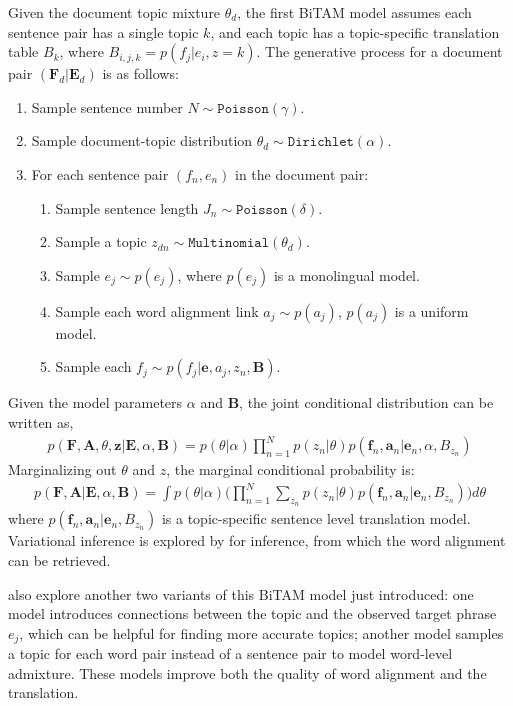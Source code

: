 Given the document topic mixture $\theta_d$, the first BiTAM model assumes each sentence pair has a single topic $k$, and each topic has a topic-specific translation table $B_k$, where $B_{i,j,k} = p(f_j | e_i, z=k)$. The generative process for a document pair $(\textbf{F}_d | \textbf{E}_d)$ is as follows:
\begin{enumerate}
\item Sample sentence number $N \sim \texttt{Poisson}(\gamma)$.
\item Sample document-topic distribution $\theta_d \sim \texttt{Dirichlet}(\alpha)$.
\item For each sentence pair $(f_n, e_n)$ in the document pair:
\begin{enumerate}
\item Sample sentence length $J_n \sim \texttt{Poisson}(\delta)$.
\item Sample a topic $z_{dn} \sim \texttt{Multinomial}(\theta_d)$.
\item Sample $e_j \sim p(e_j)$, where $p(e_j)$ is a monolingual model.
\item Sample each word alignment link $a_j \sim p(a_j)$, $p(a_j)$ is a uniform model.
\item Sample each $f_j \sim p(f_j | \textbf{e}, a_j, z_n, \textbf{B})$.
\end{enumerate}
\end{enumerate}

Given the model parameters $\alpha$ and $\textbf{B}$, the joint conditional distribution can be written as,
\begin{align}
p(\textbf{F}, \textbf{A}, \theta, \textbf{z} | \textbf{E}, \alpha, \textbf{B}) = p(\theta | \alpha) \prod_{n=1}^{N}p(z_n | \theta)p(\textbf{f}_n, \textbf{a}_n | \textbf{e}_n, \alpha, B_{z_n})
\end{align}
Marginalizing out $\theta$ and $z$, the marginal conditional probability is:
\begin{align}
p(\textbf{F}, \textbf{A} | \textbf{E}, \alpha, \textbf{B}) = \int p(\theta | \alpha) \Big ( \prod_{n=1}^{N} \sum_{z_n} p(z_n | \theta)p(\textbf{f}_n, \textbf{a}_n | \textbf{e}_n, B_{z_n}) \Big ) d\theta
\end{align}
where $p(\textbf{f}_n, \textbf{a}_n | \textbf{e}_n, B_{z_n})$ is a topic-specific sentence level translation model. Variational inference is explored by \citet{zhao-06} for inference, from which the word alignment can be retrieved.

\citet{zhao-06} also explore another two variants of this BiTAM model just introduced: one model introduces connections between the topic and the observed target phrase $e_j$, which can be helpful for finding more accurate topics; another model samples a topic for each word pair instead of a sentence pair to model word-level admixture. These models improve both the quality of word alignment and the translation.


